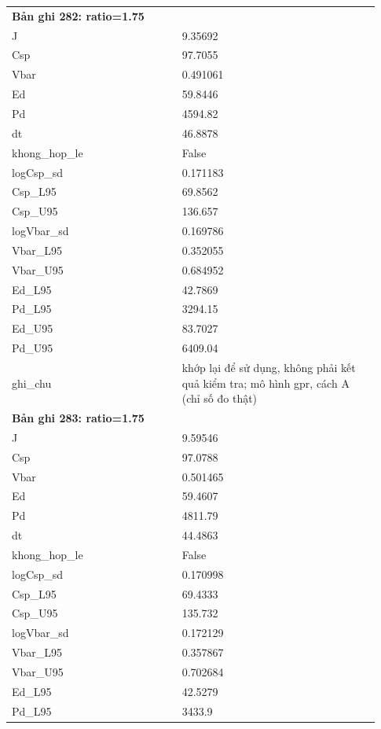 \begin{longtable}{p{0.43\linewidth}p{0.50\linewidth}}
\midrule
\multicolumn{2}{p{0.95\linewidth}}{\textbf{Bản ghi 282: ratio=1.75}} \\
J & 9.35692 \\
Csp & 97.7055 \\
Vbar & 0.491061 \\
Ed & 59.8446 \\
Pd & 4594.82 \\
dt & 46.8878 \\
khong\_\allowbreak hop\_\allowbreak le & False \\
logCsp\_\allowbreak sd & 0.171183 \\
Csp\_\allowbreak L95 & 69.8562 \\
Csp\_\allowbreak U95 & 136.657 \\
logVbar\_\allowbreak sd & 0.169786 \\
Vbar\_\allowbreak L95 & 0.352055 \\
Vbar\_\allowbreak U95 & 0.684952 \\
Ed\_\allowbreak L95 & 42.7869 \\
Pd\_\allowbreak L95 & 3294.15 \\
Ed\_\allowbreak U95 & 83.7027 \\
Pd\_\allowbreak U95 & 6409.04 \\
ghi\_\allowbreak chu & khớp lại để sử dụng, không phải kết quả kiểm tra; mô hình gpr, cách A (chỉ số đo thật) \\
\midrule
\multicolumn{2}{p{0.95\linewidth}}{\textbf{Bản ghi 283: ratio=1.75}} \\
J & 9.59546 \\
Csp & 97.0788 \\
Vbar & 0.501465 \\
Ed & 59.4607 \\
Pd & 4811.79 \\
dt & 44.4863 \\
khong\_\allowbreak hop\_\allowbreak le & False \\
logCsp\_\allowbreak sd & 0.170998 \\
Csp\_\allowbreak L95 & 69.4333 \\
Csp\_\allowbreak U95 & 135.732 \\
logVbar\_\allowbreak sd & 0.172129 \\
Vbar\_\allowbreak L95 & 0.357867 \\
Vbar\_\allowbreak U95 & 0.702684 \\
Ed\_\allowbreak L95 & 42.5279 \\
Pd\_\allowbreak L95 & 3433.9 \\

\end{longtable}
